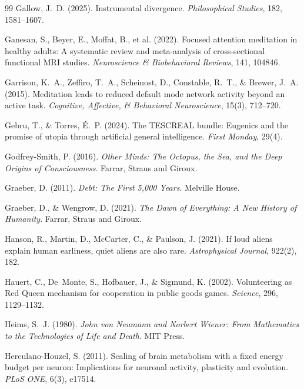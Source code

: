 \documentclass[11pt,a4paper,twocolumn]{article}
\begin{document}
\begin{thebibliography}{99}
 Gallow, J.~D. (2025). Instrumental divergence. \textit{Philosophical Studies}, 182, 1581--1607.

 Ganesan, S., Beyer, E., Moffat, B., et al. (2022). Focused attention meditation in healthy adults: A systematic review and meta-analysis of cross-sectional functional MRI studies. \textit{Neuroscience \& Biobehavioral Reviews}, 141, 104846.

 Garrison, K.~A., Zeffiro, T.~A., Scheinost, D., Constable, R.~T., \& Brewer, J.~A. (2015). Meditation leads to reduced default mode network activity beyond an active task. \textit{Cognitive, Affective, \& Behavioral Neuroscience}, 15(3), 712--720.

 Gebru, T., \& Torres, \'E.~P. (2024). The TESCREAL bundle: Eugenics and the promise of utopia through artificial general intelligence. \textit{First Monday}, 29(4).

 Godfrey-Smith, P. (2016). \textit{Other Minds: The Octopus, the Sea, and the Deep Origins of Consciousness}. Farrar, Straus and Giroux.

 Graeber, D. (2011). \textit{Debt: The First 5,000 Years}. Melville House.

 Graeber, D., \& Wengrow, D. (2021). \textit{The Dawn of Everything: A New History of Humanity}. Farrar, Straus and Giroux.

 Hanson, R., Martin, D., McCarter, C., \& Paulson, J. (2021). If loud aliens explain human earliness, quiet aliens are also rare. \textit{Astrophysical Journal}, 922(2), 182.

 Hauert, C., De~Monte, S., Hofbauer, J., \& Sigmund, K. (2002). Volunteering as Red Queen mechanism for cooperation in public goods games. \textit{Science}, 296, 1129--1132.

 Heims, S.~J. (1980). \textit{John von Neumann and Norbert Wiener: From Mathematics to the Technologies of Life and Death}. MIT Press.

 Herculano-Houzel, S. (2011). Scaling of brain metabolism with a fixed energy budget per neuron: Implications for neuronal activity, plasticity and evolution. \textit{PLoS ONE}, 6(3), e17514.


\end{thebibliography}
\end{document}
